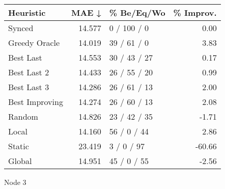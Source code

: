 \begin{tabular}{lrlr}
\toprule
\textbf{Heuristic} & \textbf{MAE ↓} & \textbf{\% Be/Eq/Wo} & \textbf{\% Improv.} \\
\midrule
            Synced &         14.577 &          0 / 100 / 0 &                0.00 \\
     Greedy Oracle &         14.019 &          39 / 61 / 0 &                3.83 \\
         Best Last &         14.553 &         30 / 43 / 27 &                0.17 \\
       Best Last 2 &         14.433 &         26 / 55 / 20 &                0.99 \\
       Best Last 3 &         14.286 &         26 / 61 / 13 &                2.00 \\
    Best Improving &         14.274 &         26 / 60 / 13 &                2.08 \\
            Random &         14.826 &         23 / 42 / 35 &               -1.71 \\
             Local &         14.160 &          56 / 0 / 44 &                2.86 \\
            Static &         23.419 &           3 / 0 / 97 &              -60.66 \\
            Global &         14.951 &          45 / 0 / 55 &               -2.56 \\
\bottomrule
\end{tabular}
\caption{Node 3}
\label{tab:iid_lr05_le1_bs2_3}
